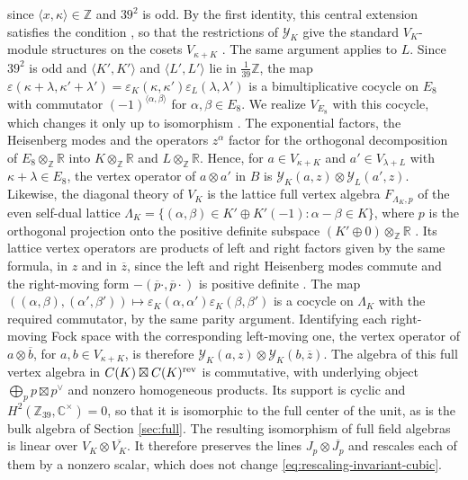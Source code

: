 \documentclass[leqno]{article}
\newcommand{\Cbb}{\ensuremath{\mathbb{C}}}
\let\cal\relax
\newcommand{\cal}{\mathcal}
\newcommand{\Z}{\ensuremath{\mathbb{Z}}}
\newcommand{\R}{\ensuremath{\mathbb{R}}}
\newcommand{\ot}{\otimes}
\newcommand{\epsi}{\varepsilon}
\numberwithin{equation}{section}
\begin{document}
since $\langle x,\kappa\rangle \in \Z$ and $39^2$ is odd. By the first identity, this central extension satisfies the condition \cite[(6.4.87) p.~237]{LL04}, so that the restrictions of $\mathcal Y_K$ give the standard $V_K$-module structures on the cosets $V_{\kappa+K}$ \cite[Theorem 6.5.20 p.~259]{LL04}. The same argument applies to $L$. Since $39^2$ is odd and $\langle K',K'\rangle$ and $\langle L',L'\rangle$ lie in $\frac1{39}\Z$, the map $\epsi(\kappa+\lambda,\kappa'+\lambda') = \epsi_K(\kappa,\kappa')\epsi_L(\lambda,\lambda')$ is a bimultiplicative cocycle on $E_8$ with commutator $(-1)^{\langle\alpha,\beta\rangle}$ for $\alpha,\beta \in E_8$. We realize $V_{E_8}$ with this cocycle, which changes it only up to isomorphism \cite[Proposition 6.5.5 p.~244]{LL04}. The exponential factors, the Heisenberg modes and the operators $z^\alpha$ factor for the orthogonal decomposition of $E_8\ot_\Z\R$ into $K\ot_\Z\R$ and $L\ot_\Z\R$. Hence, for $a \in V_{\kappa+K}$ and $a' \in V_{\lambda+L}$ with $\kappa+\lambda \in E_8$, the vertex operator of $a\ot a'$ in $B$ is $\mathcal Y_K(a,z)\ot\mathcal Y_L(a',z)$. Likewise, the diagonal theory of $V_K$ is the lattice full vertex algebra $F_{\Lambda_K,p}$ of the even self-dual lattice $\Lambda_K = \{(\alpha,\beta) \in K'\oplus K'(-1):\alpha-\beta \in K\}$, where $p$ is the orthogonal projection onto the positive definite subspace $(K'\oplus0)\ot_\Z\R$ \cite[Theorem 4.14 p.~43 and Section 5.4 p.~52]{Mor23}. Its lattice vertex operators are products of left and right factors given by the same formula, in $z$ and in $\overline z$, since the left and right Heisenberg modes commute and the right-moving form $-(\overline p\cdot,\overline p\cdot)$ is positive definite \cite[(4.2) and the definition of $e^\alpha(z)$, pp.~39--40]{Mor23}. The map $((\alpha,\beta),(\alpha',\beta')) \mapsto \epsi_K(\alpha,\alpha')\epsi_K(\beta,\beta')$ is a cocycle on $\Lambda_K$ with the required commutator, by the same parity argument. Identifying each right-moving Fock space with the corresponding left-moving one, the vertex operator of $a\ot\overline b$, for $a,b \in V_{\kappa+K}$, is therefore $\mathcal Y_K(a,z)\ot\mathcal Y_K(b,\overline z)$. The algebra of this full vertex algebra in $\cal C(K)\boxtimes\cal C(K)^{\mathrm{rev}}$ \cite{Kon07} is commutative, with underlying object $\bigoplus_pp\boxtimes p^\vee$ and nonzero homogeneous products. Its support is cyclic and $H^2(\Z_{39},\Cbb^\times) = 0$, so that it is isomorphic to the full center of the unit, as is the bulk algebra of Section \ref{sec:full}. The resulting isomorphism of full field algebras is linear over $V_K\ot\overline{V_K}$. It therefore preserves the lines $J_p\ot\overline{J_p}$ and rescales each of them by a nonzero scalar, which does not change \eqref{eq:rescaling-invariant-cubic}.
\end{document}
